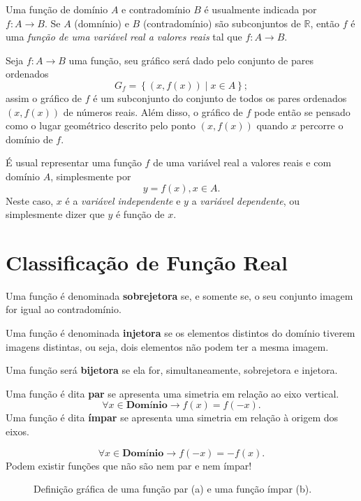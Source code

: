 	 Uma função de domínio $A$ e contradomínio $B$ é usualmente indicada por $f:A\rightarrow B$. Se $A$ (domnínio) e $B$ (contradomínio) são subconjuntos de $\mathbb{R}$, então $f$ é uma \textit{função de uma variável real a valores reais} tal que $f:A\rightarrow B$.

	 Seja $f:A\rightarrow B$ uma função, seu gráfico será dado pelo conjunto de pares ordenados
	 \begin{equation}
	 G_f = \left\{ \left(x,f\left(x\right)\right) \mid x \in A \right\};
	 \end{equation}
	 assim o gráfico de $f$ é um subconjunto do conjunto de todos os pares ordenados $\left(x,f(x)\right)$ de números reais. Além disso, o gráfico de $f$ pode então se pensado como o lugar geométrico descrito pelo ponto $\left(x,f(x)\right)$ quando $x$ percorre o domínio de $f$.

	 É usual representar uma função $f$ de uma variável real a valores reais e com domínio $A$, simplesmente por \[
	 	y=f(x),x \in A
	 .\] Neste caso, $x$ é a \textit{variável independente} e $y$ a \textit{variável dependente}, ou simplesmente dizer que $y$ é função de $x$.
	 

	\section{Classificação de Função Real}
	\label{sec:classificação_de_função_real}
	
	Uma função é denominada \textbf{sobrejetora} se, e somente se, o seu conjunto imagem for igual ao contradomínio.	

	Uma função é denominada \textbf{injetora} se os elementos distintos do domínio tiverem imagens distintas, ou seja, dois elementos não podem ter a mesma imagem.
	
	Uma função será \textbf{bijetora} se ela for, simultaneamente, sobrejetora e injetora.

	Uma função é dita \textbf{par} se apresenta	uma simetria em relação ao eixo vertical.
	\[
		\forall x \in \textbf{Domínio} \rightarrow f(x) = f(-x)
	.\] 
	Uma função é dita \textbf{ímpar} se apresenta uma simetria em relação à origem dos eixos.

	\[
		\forall x \in \textbf{Domínio} \rightarrow f(-x) = -f(x)
	.\]
	Podem existir funções que não são nem par e nem ímpar!

	\begin{figure}[ht]
	   \centering
	   \caption{Definição gráfica de uma função par (a) e uma função ímpar (b).}
	   \label{fig:par_impar}
	\end{figure}
	
